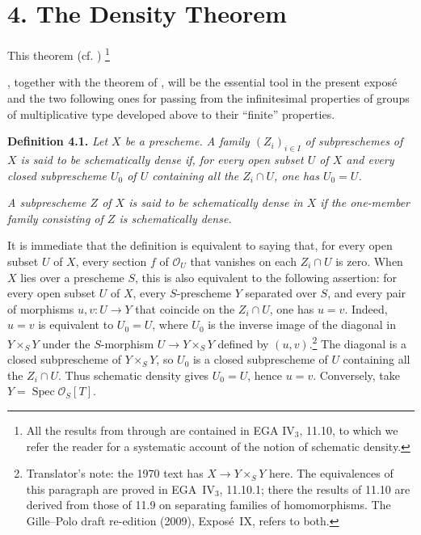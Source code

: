

\section*{4. The Density Theorem}

This theorem (cf. )%
\begingroup
\renewcommand{\thefootnote}{\(\ast\)}%
\footnote{All the results from
 through
 are contained in EGA
IV\(_3\), 11.10, to which we refer the reader for a systematic account of
the notion of schematic density.}%
\addtocounter{footnote}{-1}%
\endgroup,
together with the theorem of , will be the
essential tool in the present expos\'e and the two following ones for
passing from the infinitesimal properties of groups of multiplicative type
developed above to their ``finite'' properties.

\medskip
\noindent{}\textbf{Definition 4.1.}
\textit{Let \(X\) be a prescheme. A family
\((Z_i)_{i\in I}\) of subpreschemes of \(X\) is said to be
\emph{schematically dense} if, for every open subset \(U\) of \(X\) and
every closed subprescheme \(U_0\) of \(U\) containing all the
\(Z_i\cap U\), one has \(U_0=U\).}

\textit{A subprescheme \(Z\) of \(X\) is said to be
\emph{schematically dense in \(X\)} if the one-member family consisting
of \(Z\) is schematically dense.}

It is immediate that the definition is
equivalent to saying that, for every open subset \(U\) of \(X\), every
section \(f\) of \(\mathscr O_U\) that vanishes on each \(Z_i\cap U\)
is zero.
When \(X\) lies over a prescheme \(S\), this is also equivalent to the
following assertion: for every open subset \(U\) of \(X\), every
\(S\)-prescheme \(Y\) separated over \(S\), and every pair of morphisms
\(u,v:U\to Y\) that coincide on the \(Z_i\cap U\), one has \(u=v\).
Indeed, \(u=v\) is equivalent to \(U_0=U\), where \(U_0\) is the inverse
image of the diagonal in \(Y\times_S Y\) under the \(S\)-morphism
\(U\to Y\times_S Y\) defined by \((u,v)\).\footnote{Translator's note: the
1970 text has \(X\to Y\times_SY\) here. The equivalences of this paragraph
are proved in EGA~IV\(_3\), 11.10.1; there the results of 11.10 are derived
from those of 11.9 on separating families of homomorphisms. The
Gille--Polo draft re-edition (2009), Expos\'e~IX, refers to both.} The diagonal is a closed
subprescheme of \(Y\times_S Y\), so \(U_0\) is a closed subprescheme of
\(U\) containing all the \(Z_i\cap U\). Thus schematic density gives
\(U_0=U\), hence \(u=v\). Conversely, take
\(Y=\operatorname{Spec}\mathscr O_S[T]\).

